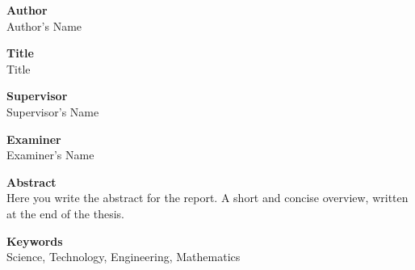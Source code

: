\documentclass[../main.tex]{subfiles}
\begin{document}
\raggedright\textbf{Author}\\
Author's Name\vspace{5mm}

\raggedright\textbf{Title}\\
Title\vspace{5mm}

\raggedright\textbf{Supervisor}\\
Supervisor's Name\vspace{5mm}

\raggedright\textbf{Examiner}\\
Examiner's Name\vspace{5mm}

\raggedright\textbf{Abstract}\\
\justifying\noindent
Here you write the abstract for the report. A short and concise overview, written at the end of the thesis.\vspace{5mm}

\raggedright\textbf{Keywords}\\
\noindent
Science, Technology, Engineering, Mathematics
\end{document}
